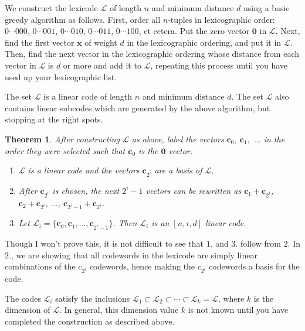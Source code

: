 \documentclass{article}
\newtheorem{theorem}{Theorem}
\numberwithin{theorem}{subsection}
\theoremstyle{definition}
\numberwithin{exmp}{subsection}
\theoremstyle{definition}
\numberwithin{defn}{subsection}
\theoremstyle{definition}
\numberwithin{claim}{subsection}
\begin{document}
We construct the lexicode $\mathcal{L}$ of length $n$ and minimum distance $d$ using a basic greedy algorithm as follows.  First, order all $n$-tuples in lexicographic order:
$0\cdots000$, $0\cdots001$, $0\cdots010$, $0\cdots011$, $0\cdots100$, et cetera.  Put the zero vector $\mathbf{0}$ in $\mathcal{L}$.  Next, find the first vector $\mathbf{x}$
of weight $d$ in the lexicographic ordering, and put it in $\mathcal{L}$.  Then, find the next vector in  the lexicographic ordering whose distance from each vector in $\mathcal{L}$ is 
$d$ or more and add it to $\mathcal{L}$, repeating this process until you have used up your lexicographic list.

The set $\mathcal{L}$ is a linear code of length $n$ and minimum distance $d$.  The set $\mathcal{L}$ also contains linear subcodes which are generated by the above algorithm,
but stopping at the right spots.

\begin{theorem}
After constructing $\mathcal{L}$ as above, label the vectors $\mathbf{c}_0$, $\mathbf{c}_1,$ $\ldots$ in the order they were selected such that $\mathbf{c}_0$ is the $\mathbf{0}$ 
vector.

\begin{enumerate}
\item $\mathcal{L}$ is a linear code and the vectors $\mathbf{c}_{2^i}$ are a basis of $\mathcal{L}$.  
\item After $\mathbf{c}_{2^i}$ is chosen, the next $2^i -1$ vectors can be rewritten as $\mathbf{c}_1 + \mathbf{c}_{2^i}$, $\mathbf{c}_2 + \mathbf{c}_{2^i}$, $\ldots$, 
$\mathbf{c}_{2^i -1} + \mathbf{c}_{2^i}$.
\item Let $\mathcal{L}_i = \{\mathbf{c}_0,\mathbf{c}_1,\ldots,\mathbf{c}_{2^i -1}\}$.  Then $\mathcal{L}_i$ is an $[n,i,d]$ linear code.

\end{enumerate}

\end{theorem}

Though I won't prove this, it is not difficult to see that $1.$ and $3.$ follow from $2.$    In $2.$, we are showing that all codewords in the lexicode are simply linear combinations of 
the $c_{2^i}$ codewords, hence making the $c_{2^i}$ codewords a basis for the code.

The codes $\mathcal{L}_i$ satisfy the inclusions $\mathcal{L}_1 \subset \mathcal{L}_2 \subset \cdots \subset \mathcal{L}_k = \mathcal{L}$, where $k$ is the dimension of 
$\mathcal{L}$.  In general, this dimension value $k$ is not known until you have completed the construction as described above.
\end{document}
